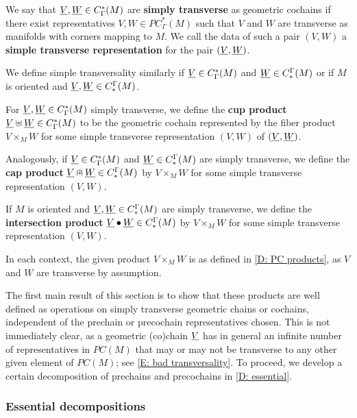 \begin{definition}\label{D: cochain trans}
	We say that $\underline{V}, \underline{W} \in C^*_{\Gamma}(M)$ are \textbf{simply transverse} as geometric cochains if there exist representatives $V,W \in PC^*_\Gamma(M)$ such that $V$ and $W$ are transverse as manifolds with corners mapping to $M$.
	We call the data of such a pair $(V,W)$ a \textbf{simple transverse representation} for the pair $(\underline{V},\underline{W})$.

	We define simple transversality similarly if $\underline{V} \in C^*_{\Gamma}(M)$ and $\underline{W} \in C_*^{\Gamma}(M)$ or if $M$ is oriented and $\underline{V}, \underline{W} \in C_*^{\Gamma}(M)$.
\end{definition}

\begin{definition}\label{D: cochain products}
	For $\underline{V}, \underline{W} \in C^*_{\Gamma}(M)$ simply transverse, we define the \textbf{cup product} $\underline{V} \uplus \underline{W} \in C^*_\Gamma(M)$ to be the geometric cochain represented by the fiber product $V \times_M W$ for some simple transverse representation $(V,W)$ of $(\underline{V},\underline{W})$.

	Analogously, if $\underline{V} \in C^*_{\Gamma}(M)$ and $\underline{W} \in C_*^{\Gamma}(M)$ are simply transverse, we define the \textbf{cap product} $\underline{V} \nplus \underline{W} \in C_*^\Gamma(M)$ by $V \times_M W$ for some simple transverse representation $(V,W)$.

	If $M$ is oriented and $\underline{V},\underline{W} \in C_*^\Gamma(M)$ are simply transverse, we define the \textbf{intersection product} $\underline{V} \bullet \underline{W} \in C_*^\Gamma(M)$ by $V \times_M W$ for some simple transverse representation $(V,W)$.

	In each context, the given product $V \times_M W$ is as defined in \cref{D: PC products}, as $V$ and $W$ are transverse by assumption.
\end{definition}

The first main result of this section is to show that these products are well defined as operations on simply transverse geometric chains or cochains, independent of the prechain or precochain representatives chosen.
This is not immediately clear, as a geometric (co)chain $\underline{V}$ has in general an infinite number of representatives in $PC(M)$ that may or may not be transverse to any other given element of $PC(M)$; see \cref{E: bad transversality}.
To proceed, we develop a certain decomposition of prechains and precochains in \cref{D: essential}.

\subsubsection{Essential decompositions}\label{S: essential decomp}


